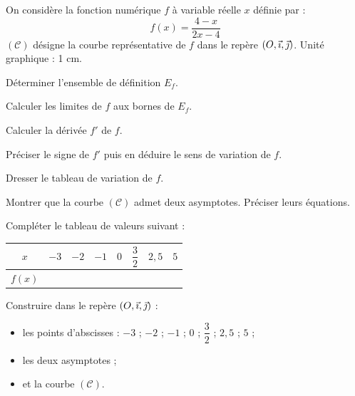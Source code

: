 \documentclass[11pt]{article}
\begin{document}
On considère la fonction numérique $f$ à variable réelle $x$ définie par :
\[ f(x) = \frac{4 - x}{2x - 4} \]
$(\mathcal{C})$ désigne la courbe représentative de $f$ dans le repère $(O,\vec{\imath},\vec{\jmath})$. Unité graphique : 1 cm.
\begin{questions}
  \item Déterminer l'ensemble de définition $E_f$.
  \item Calculer les limites de $f$ aux bornes de $E_f$.
  \item Calculer la dérivée $f'$ de $f$.
  \item Préciser le signe de $f'$ puis en déduire le sens de variation de $f$.
  \item Dresser le tableau de variation de $f$.
  \item Montrer que la courbe $(\mathcal{C})$ admet deux asymptotes. Préciser leurs équations.
  \item Compléter le tableau de valeurs suivant :
  \begin{center}\renewcommand{\arraystretch}{1.5}
  \begin{tabular}{|c|c|c|c|c|c|c|c|}
  \hline
  $x$ & $-3$ & $-2$ & $-1$ & $0$ & $\dfrac{3}{2}$ & $2{,}5$ & $5$ \\
  \hline
  $f(x)$ & & & & & & & \\
  \hline
  \end{tabular}
  \end{center}
  \item Construire dans le repère $(O,\vec{\imath},\vec{\jmath})$ :
  \begin{itemize}
    \item les points d'abscisses : $-3$ ; $-2$ ; $-1$ ; $0$ ; $\dfrac{3}{2}$ ; $2{,}5$ ; $5$ ;
    \item les deux asymptotes ;
    \item et la courbe $(\mathcal{C})$.
  \end{itemize}
\end{questions}
\end{document}
